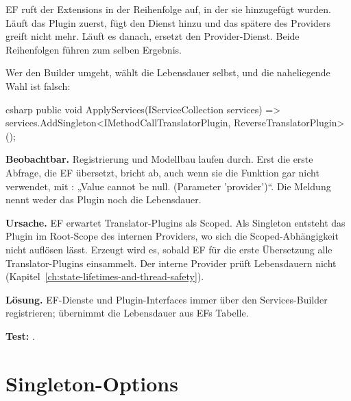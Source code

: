 \begin{note}
  EF ruft  der Extensions in der Reihenfolge auf, in der
  sie hinzugefügt wurden. Läuft das Plugin zuerst, fügt  den Dienst hinzu und
  das spätere  des Providers greift nicht mehr. Läuft es danach,
  ersetzt  den Provider-Dienst. Beide Reihenfolgen führen zum selben Ergebnis.
\end{note}

Wer den Builder umgeht, wählt die Lebensdauer selbst, und die naheliegende Wahl ist falsch:

\begin{sourcecode}{csharp}
public void ApplyServices(IServiceCollection services)
    => services.AddSingleton<IMethodCallTranslatorPlugin, ReverseTranslatorPlugin>();
\end{sourcecode}

\begin{failure}
  \textbf{Beobachtbar.} Registrierung und Modellbau laufen durch. Erst die erste Abfrage,
  die EF übersetzt, bricht ab, auch wenn sie die Funktion gar nicht verwendet, mit
  : „Value cannot be null.
  (Parameter 'provider')“. Die Meldung nennt weder das Plugin noch die Lebensdauer.

  \textbf{Ursache.} EF erwartet Translator-Plugins als Scoped. Als Singleton entsteht das
  Plugin im Root-Scope des internen Providers, wo sich die Scoped-Abhängigkeit
   nicht auflösen lässt. Erzeugt wird es,
  sobald EF für die erste Übersetzung alle Translator-Plugins einsammelt. Der interne
  Provider prüft Lebensdauern nicht (Kapitel~\ref{ch:state-lifetimes-and-thread-safety}).

  \textbf{Lösung.} EF-Dienste und Plugin-Interfaces immer über den Services-Builder
  registrieren;  übernimmt die Lebensdauer aus EFs Tabelle.

  \textbf{Test:}
  .
\end{failure}

\section{Singleton-Options}

